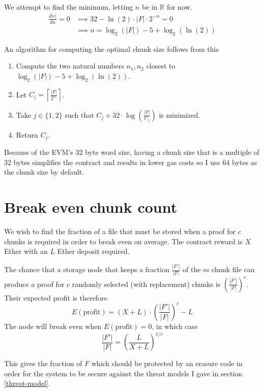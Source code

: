 \documentclass[12pt,a4paper,twoside,openright]{report}
\begin{document}
\begin{appendices}
We attempt to find the minimum, letting $n$ be in $\mathbb{R}$ for now.
\begin{align*}
\frac{d |r|}{d n} = 0 &\implies 32 - \ln(2) \cdot |F| \cdot 2^{-n} = 0\\
&\implies n = \log_2(|F|) - 5 + \log_2(\ln(2))
\end{align*}

An algorithm for computing the optimal chunk size follows from this
\begin{enumerate}
\item Compute the two natural numbers $n_1, n_2$ closest to $\log_2(|F|) - 5 + \log_2(\ln(2))$.
\item Let $C_i = \left\lceil \frac{|F|}{2^{n_i}}\right\rceil$.
\item Take $j \in \{1, 2\}$ such that $C_j + 32 \cdot \log\left(\frac{|F|}{C_j}\right)$ is minimized.
\item Return $C_j$.
\end{enumerate}

Because of the EVM's 32 byte word size, having a chunk size that is a multiple of 32 bytes simplifies the contract and results in lower gas costs
so I use 64 bytes as the chunk size by default.


\section{Break even chunk count}\label{app-break-even-chunk-count}

We wish to find the fraction of a file that must be stored when a proof for $c$ chunks is required in order to break even on average.
The contract reward is $X$ Ether with an $L$ Ether deposit required.

The chance that a storage node that keeps a fraction $\displaystyle \frac{|F'|}{|F|}$ of the $m$ chunk file can produce a proof for
$c$ randomly selected (with replacement) chunks is
$\displaystyle \left(\frac{|F'|}{|F|}\right)^c$.
Their expected profit is therefore
\[E(\text{profit}) = (X + L) \cdot \left(\frac{|F'|}{|F|}\right)^c - L\]
The node will break even when $E(\text{profit}) = 0$, in which case
\[\frac{|F'|}{|F|} = \left(\frac{L}{X+L}\right)^{1/c}\]

This gives the fraction of $F$ which should be protected by an erasure code in order for the system
to be secure against the threat models I gave in section \ref{threat-model}. %







\end{appendices}
\end{document}
